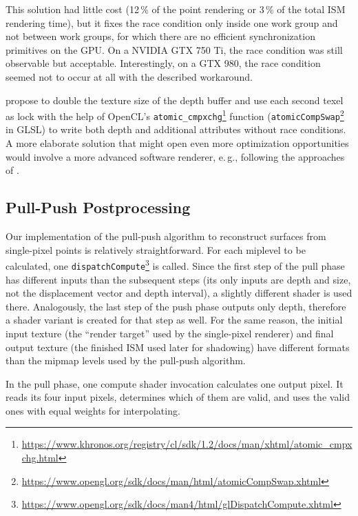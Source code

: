 This solution had little cost (12\,\% of the point rendering or 3\,\% of the total ISM rendering time), but it fixes the race condition only inside one work group and not between work groups, for which there are no efficient synchronization primitives on the GPU. On a NVIDIA GTX 750 Ti, the race condition was still observable but acceptable. Interestingly, on a GTX 980, the race condition seemed not to occur at all with the described workaround.

\citet{Günther:2013:AcceleratedPointCloudRendering} propose to double the texture size of the depth buffer and use each second texel as lock with the help of OpenCL's \texttt{atomic\_cmpxchg}\footnote{\url{https://www.khronos.org/registry/cl/sdk/1.2/docs/man/xhtml/atomic_cmpxchg.html}} function (\texttt{atomicCompSwap}\footnote{\url{https://www.opengl.org/sdk/docs/man/html/atomicCompSwap.xhtml}} in GLSL) to write both depth and additional attributes without race conditions. A more elaborate solution that might open  even more optimization opportunities would involve a more advanced software renderer, e.\,g., following the approaches of \citet{Laine:2011:SoftwareRasterization}.


\subsection{Pull-Push Postprocessing}
\label{sec:impl:pullPushPostprocessing}

Our implementation of the pull-push algorithm to reconstruct surfaces from single-pixel points is relatively straightforward. For each miplevel to be calculated, one \texttt{dispatchCompute}\footnote{\url{https://www.opengl.org/sdk/docs/man4/html/glDispatchCompute.xhtml}} is called. Since the first step of the pull phase has different inputs than the subsequent steps (its only inputs are depth and size, not the displacement vector and depth interval), a slightly different shader is used there. Analogously, the last step of the push phase outputs only depth, therefore a shader variant is created for that step as well. For the same reason, the initial input texture (the ``render target'' used by the single-pixel renderer) and final output texture (the finished ISM used later for shadowing) have different formats than the mipmap levels used by the pull-push algorithm.


In the pull phase, one compute shader invocation calculates one output pixel. It reads its four input pixels, determines which of them are valid, and uses the valid ones with equal weights for interpolating.


